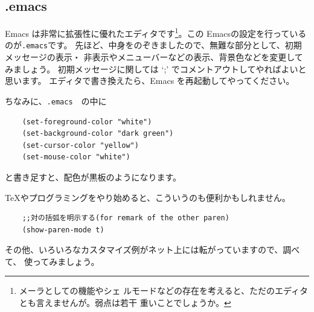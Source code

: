 \documentclass[a4j]{ltjsreport}
\begin{document}





    \subsection{.emacs}
    Emacs は非常に拡張性に優れたエディタです\footnote{メーラとしての機能やシェ
    ルモードなどの存在を考えると、ただのエディタとも言えませんが。弱点は若干
    重いことでしょうか。}。この Emacsの設定を行っているのが\verb+.emacs+です。
    先ほど、中身をのぞきましたので、無難な部分として、初期メッセージの表示・
    非表示やメニューバーなどの表示、背景色などを変更してみましょう。
    初期メッセージに関しては `;' でコメントアウトしてやればよいと思います。
    エディタで書き換えたら、Emacs を再起動してやってください。

    ちなみに、\verb+.emacs+　の中に
    \begin{verbatim}
    (set-foreground-color "white")
    (set-background-color "dark green")
    (set-cursor-color "yellow")
    (set-mouse-color "white")
    \end{verbatim}
    と書き足すと、配色が黒板のようになります。

    \TeX やプログラミングをやり始めると、こういうのも便利かもしれません。
    \begin{verbatim}
    ;;対の括弧を明示する(for remark of the other paren)
    (show-paren-mode t)
    \end{verbatim}

    その他、いろいろなカスタマイズ例がネット上には転がっていますので、調べて、
    使ってみましょう。
\end{document}
